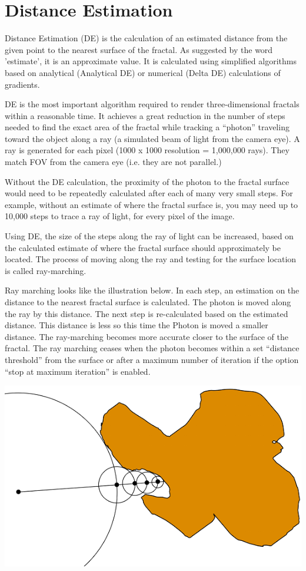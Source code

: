 \section{Distance Estimation}\label{distance-estimation}

Distance Estimation (DE) is the calculation of an estimated distance from the
given point to the nearest surface of the fractal. As suggested by the word
'estimate', it is an approximate value. It is calculated using simplified
algorithms based on analytical (Analytical DE) or numerical (Delta DE)
calculations of gradients.

DE is the most important algorithm required to render three-dimensional fractals
within a reasonable time. It achieves a great reduction in the number of steps
needed to find the exact area of the fractal while tracking a ``photon''
traveling toward the object along a ray (a simulated beam of light from the
camera eye). A ray is generated for each pixel (1000 x 1000 resolution =
1,000,000 rays). They match FOV from the camera eye (i.e. they are not
parallel.)

Without the DE calculation, the proximity of the photon to the fractal surface
would need to be repeatedly calculated after each of many very small steps. For
example, without an estimate of where the fractal surface is, you may need up to
10,000 steps to trace a ray of light, for every pixel of the image.

Using DE, the size of the steps along the ray of light can be increased, based
on the calculated estimate of where the fractal surface should approximately be
located. The process of moving along the ray and testing for the surface
location is called ray-marching.

Ray marching looks like the illustration below. In each step, an estimation on
the distance to the nearest fractal surface is calculated. The photon is moved
along the ray by this distance. The next step is re-calculated based on the
estimated distance. This distance is less so this time the Photon is moved a
smaller distance. The ray-marching becomes more accurate closer to the surface
of the fractal. The ray marching ceases when the photon becomes within a set
``distance threshold'' from the surface or after a maximum number of iteration
if the option ``stop at maximum iteration'' is enabled.

\includegraphics[width=0.7\linewidth]{img/manual/media/distance_estimation_defactor_1.png}

